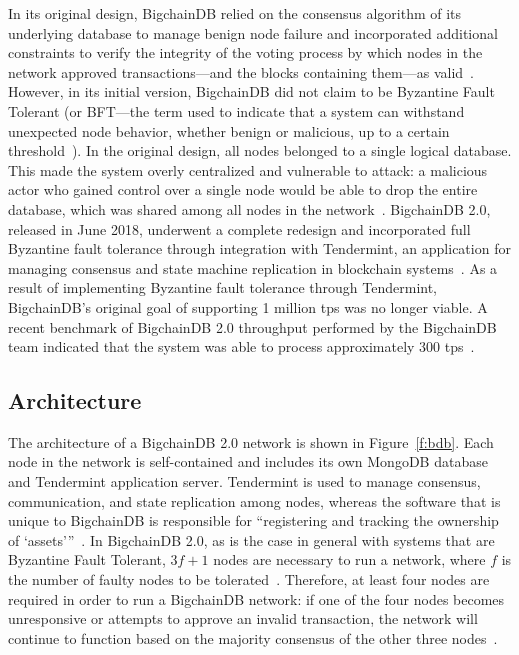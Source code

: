 In its original design, BigchainDB relied on the consensus algorithm of
its underlying database to manage benign node failure and incorporated
additional constraints to verify the integrity of the voting process by
which nodes in the network approved transactions---and the blocks containing
them---as valid~\cite{bigDB16a}. However, in its initial version, BigchainDB
did not claim to be Byzantine Fault Tolerant (or BFT---the term used to
indicate that a system can withstand unexpected node behavior, whether
benign or malicious, up to a certain threshold~\cite{bigDB16a}). In the
original design, all nodes belonged to a single logical database. This made
the system overly centralized and vulnerable to attack: a malicious actor
who gained control over a single node would be able to drop the entire
database, which was shared among all nodes in the network~\cite{ks16, bigDB18}.
BigchainDB 2.0, released in June 2018, underwent a complete redesign and
incorporated full Byzantine fault tolerance through integration with
Tendermint, an application for managing consensus and state machine
replication in blockchain systems~\cite{troyM18b, tender18}. As a result of
implementing Byzantine fault tolerance through Tendermint, BigchainDB's
original goal of supporting 1 million tps was no longer viable. A recent
benchmark of BigchainDB 2.0 throughput performed by the BigchainDB team
indicated that the system was able to process approximately 300
tps~\cite{troyM18a}.

\subsection{Architecture}
The architecture of a BigchainDB 2.0 network is shown in
Figure~\ref{f:bdb}. Each node in the network is self-contained and
includes its own MongoDB database and Tendermint application server.
Tendermint is used to manage consensus, communication, and state replication
among nodes, whereas the software that is unique to BigchainDB is
responsible for ``registering and tracking the
ownership of `assets'\thinspace''~\cite{troyM18b}. ﻿In BigchainDB 2.0, as is
the case in general with systems that are Byzantine Fault Tolerant, $3f + 1$
nodes are necessary to run a network, where $f$ is the number of faulty
nodes to be tolerated~\cite{bdb18}. Therefore, at least four nodes are
required in order to run a BigchainDB network: if one of the four nodes
becomes unresponsive or attempts to approve an invalid transaction, the
network will continue to function based on the majority consensus of the
other three nodes~\cite{bdb18}.

